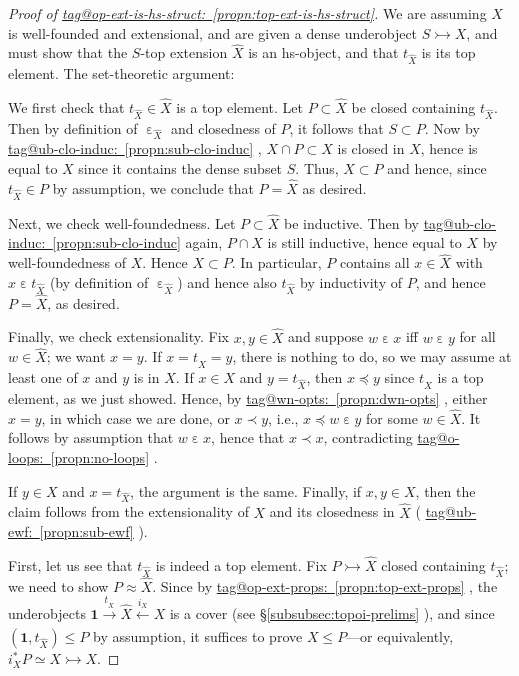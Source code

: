 \documentclass{amsart}
\makeatletter
\newcommand\ein{\mathrel{\varepsilon}}
\newcommand\tm{\mathbf{1}}
\newcommand\tox[2][]{\xrightarrow[#1]{#2}}
\newcommand\tto{\rightarrowtail}
\newcommand\unein{{\ein}}
\newcommand\wh[1]{\widehat{#1}}
\newcommand\xot[2][]{\xleftarrow[#1]{#2}}
\newcommand\tagword[1]{\csname tag@#1\endcsname}
\def\label@tag#1:#2\@nil{#1}
\newcommand\labeltag[1]{\label@tag#1:\@nil}
\newcommand\jref[1]{%
  \texorpdfstring%
    {\hyperref[#1]{\tagword{\labeltag{#1}}~\ref*{#1}}}%
    {\tagword{\labeltag{#1}}~\ref*{#1}}%
}
\newcommand\prerefpost[3]{%
  \texorpdfstring%
    {\hyperref[#2]{#1\ref*{#2}#3}}%
    {#1\ref*{#2}#3}%
}
\newcommand\sref[1]{\prerefpost{\S}{#1}{}}
\theoremstyle{definition}
\theoremstyle{remark}
\theoremstyle{plainwithref}
\newenvironment{settybox}{\begin{tcolorbox}[colback=blue!20,breakable%
    ,enhanced%
    ,sharp corners%
    ,frame hidden%
    ,boxsep=0pt
    ,left=5pt,right=5pt,top=5pt,bottom=5pt
    ,enlarge left by=-5pt,width=\linewidth+10pt
    ,enlarge top by=5pt,enlarge bottom by=5pt
    ,before skip balanced=0pt,after skip balanced=0pt
    ]}{\end{tcolorbox}}
\makeatother
\begin{document}
\begin{proof}[Proof of \jref{propn:top-ext-is-hs-struct}] \label{proof:top-ext-is-hs-struct}
  We are assuming \( X \) is well-founded and extensional, and are given a dense underobject \( S \tto X \), and must show that the \( S \)-top extension \( \wh X \) is an hs-object, and that \( t_{\wh X} \) is its top element.
  The set-theoretic argument:
  \begin{settybox}
    We first check that \( t_{\wh X} \in \wh X \) is a top element.
    Let \( P \subset \wh X \) be closed containing \( t_{\wh X} \).
    Then by definition of \( \unein_{\wh X} \) and closedness of \( P \), it follows that \( S \subset P \).
    Now by \jref{propn:sub-clo-induc}, \( X \cap P \subset X \) is closed in \( X \), hence is equal to \( X \) since it contains the dense subset \( S \).
    Thus, \( X \subset P \) and hence, since \( t_{\wh X} \in P \) by assumption, we conclude that \( P = \wh X \) as desired.

    Next, we check well-foundedness.
    Let \( P \subset \wh X \) be inductive.
    Then by \jref{propn:sub-clo-induc} again, \( P \cap X \) is still inductive, hence equal to \( X \) by well-foundedness of \( X \).
    Hence \( X \subset P \).
    In particular, \( P \) contains all \( x \in \wh X \) with \( x \ein t_{\wh X} \) (by definition of \( \unein_{\wh X} \)) and hence also \( t_{\wh X} \) by inductivity of \( P \), and hence \( P = \wh X \), as desired.

    Finally, we check extensionality.
    Fix \( x,y \in \wh X \) and suppose \( w \ein x \) iff \( w \ein y \) for all \( w \in \wh X \); we want \( x = y \).
    If \( x = t_{\wh X} = y \), there is nothing to do, so we may assume at least one of \( x \) and \( y \) is in \( X \).
    If \( x \in X \) and \( y = t_{\wh X} \), then \( x \preceq y \) since \( t_{\wh X} \) is a top element, as we just showed.
    Hence, by \jref{propn:dwn-opts}, either \( x = y \), in which case we are done, or \( x \prec y \), i.e., \( x \preceq w \ein y \) for some \( w \in \wh X \).
    It follows by assumption that \( w \ein x \), hence that \( x \prec x \), contradicting \jref{propn:no-loops}.

    If \( y \in X \) and \( x = t_{\wh X} \), the argument is the same.
    Finally, if \( x,y \in X \), then the claim follows from the extensionality of \( X \) and its closedness in \( \wh X \) (\jref{propn:sub-ewf}).
  \end{settybox}

  First, let us see that \( t_{\wh X} \) is indeed a top element.
  Fix \( P \tto \wh X \) closed containing \( t_{\wh X} \); we need to show \( P \approx \wh X \).
  Since by \jref{propn:top-ext-props}, the underobjects \( \tm \tox{t_{\wh X}} \wh X \xot{i_X} X \) is a cover (see \sref{subsubsec:topoi-prelims}), and since \( (\tm, t_{\wh X}) \le P \) by assumption, it suffices to prove \( X \le P \)---or equivalently, \( i_X^* P \simeq X \tto X \).


\end{proof}
\end{document}
